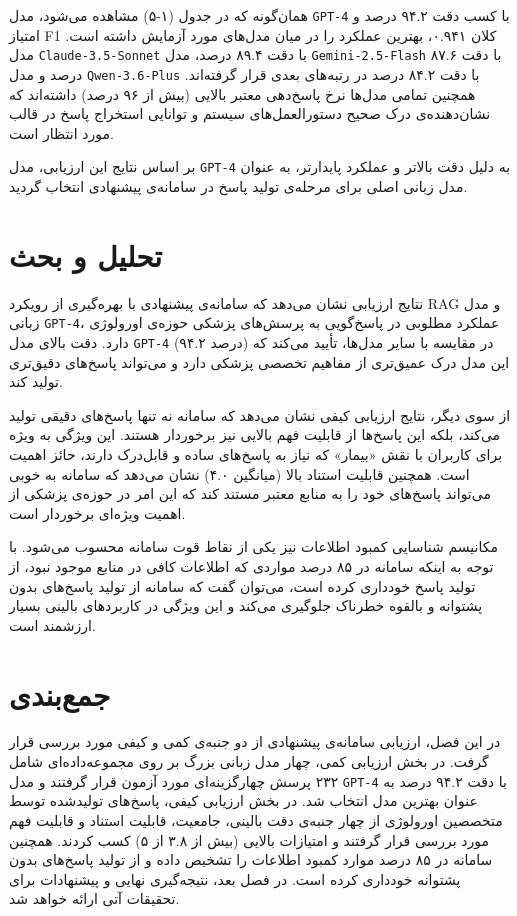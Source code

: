 همان‌گونه که در جدول (۱-۵) مشاهده می‌شود، مدل \texttt{GPT-4} با کسب دقت ۹۴.۲ درصد و امتیاز F1 کلان ۰.۹۴۱، بهترین عملکرد را در میان مدل‌های مورد آزمایش داشته است. مدل \texttt{Claude-3.5-Sonnet} با دقت ۸۹.۴ درصد، مدل \texttt{Gemini-2.5-Flash} با دقت ۸۷.۶ درصد و مدل \texttt{Qwen-3.6-Plus} با دقت ۸۴.۲ درصد در رتبه‌های بعدی قرار گرفته‌اند. همچنین تمامی مدل‌ها نرخ پاسخ‌دهی معتبر بالایی (بیش از ۹۶ درصد) داشته‌اند که نشان‌دهنده‌ی درک صحیح دستورالعمل‌های سیستم و توانایی استخراج پاسخ در قالب مورد انتظار است.

بر اساس نتایج این ارزیابی، مدل \texttt{GPT-4} به دلیل دقت بالاتر و عملکرد پایدارتر، به عنوان مدل زبانی اصلی برای مرحله‌ی تولید پاسخ در سامانه‌ی پیشنهادی انتخاب گردید.

\section{تحلیل و بحث}

نتایج ارزیابی نشان می‌دهد که سامانه‌ی پیشنهادی با بهره‌گیری از رویکرد RAG و مدل زبانی \texttt{GPT-4}، عملکرد مطلوبی در پاسخ‌گویی به پرسش‌های پزشکی حوزه‌ی اورولوژی دارد. دقت بالای مدل \texttt{GPT-4} (۹۴.۲ درصد) در مقایسه با سایر مدل‌ها، تأیید می‌کند که این مدل درک عمیق‌تری از مفاهیم تخصصی پزشکی دارد و می‌تواند پاسخ‌های دقیق‌تری تولید کند.

از سوی دیگر، نتایج ارزیابی کیفی نشان می‌دهد که سامانه نه تنها پاسخ‌های دقیقی تولید می‌کند، بلکه این پاسخ‌ها از قابلیت فهم بالایی نیز برخوردار هستند. این ویژگی به ویژه برای کاربران با نقش «بیمار» که نیاز به پاسخ‌های ساده و قابل‌درک دارند، حائز اهمیت است. همچنین قابلیت استناد بالا (میانگین ۴.۰) نشان می‌دهد که سامانه به خوبی می‌تواند پاسخ‌های خود را به منابع معتبر مستند کند که این امر در حوزه‌ی پزشکی از اهمیت ویژه‌ای برخوردار است.

مکانیسم شناسایی کمبود اطلاعات نیز یکی از نقاط قوت سامانه محسوب می‌شود. با توجه به اینکه سامانه در ۸۵ درصد مواردی که اطلاعات کافی در منابع موجود نبود، از تولید پاسخ خودداری کرده است، می‌توان گفت که سامانه از تولید پاسخ‌های بدون پشتوانه و بالقوه خطرناک جلوگیری می‌کند و این ویژگی در کاربردهای بالینی بسیار ارزشمند است.

\section{جمع‌بندی}

در این فصل، ارزیابی سامانه‌ی پیشنهادی از دو جنبه‌ی کمی و کیفی مورد بررسی قرار گرفت. در بخش ارزیابی کمی، چهار مدل زبانی بزرگ بر روی مجموعه‌داده‌ای شامل ۲۳۲ پرسش چهارگزینه‌ای مورد آزمون قرار گرفتند و مدل \texttt{GPT-4} با دقت ۹۴.۲ درصد به عنوان بهترین مدل انتخاب شد. در بخش ارزیابی کیفی، پاسخ‌های تولیدشده توسط متخصصین اورولوژی از چهار جنبه‌ی دقت بالینی، جامعیت، قابلیت استناد و قابلیت فهم مورد بررسی قرار گرفتند و امتیازات بالایی (بیش از ۳.۸ از ۵) کسب کردند. همچنین سامانه در ۸۵ درصد موارد کمبود اطلاعات را تشخیص داده و از تولید پاسخ‌های بدون پشتوانه خودداری کرده است. در فصل بعد، نتیجه‌گیری نهایی و پیشنهادات برای تحقیقات آتی ارائه خواهد شد.